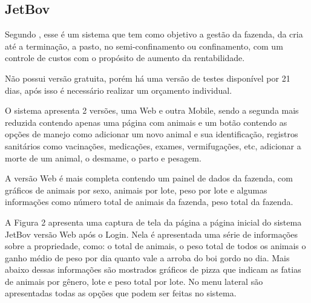 




\subsection{\textbf{JetBov}}

Segundo , esse é um sistema que tem como objetivo a gestão da fazenda, da cria até a terminação, a pasto, no semi-confinamento ou confinamento, com um controle de custos com o propósito de aumento da rentabilidade.

Não possui versão gratuita, porém há uma versão de testes disponível por 21 dias, após isso é necessário realizar um orçamento individual.

O sistema apresenta 2 versões, uma Web e outra Mobile, sendo a segunda mais reduzida contendo apenas uma página com animais e um botão contendo as opções de manejo como adicionar um novo animal e sua identificação, registros sanitários como vacinações, medicações, exames, vermifugações, etc, adicionar a morte de um animal, o desmame, o parto e pesagem.

A versão Web é mais completa contendo um painel de dados da fazenda, com gráficos de animais por sexo, animais por lote, peso por lote e algumas informações como número total de animais da fazenda, peso total da fazenda.

A Figura 2 apresenta uma captura de tela da página a página inicial do sistema JetBov versão Web após o Login. Nela é apresentada uma série de informações sobre a propriedade, como: o total de animais, o peso total de todos os animais o ganho médio de peso por dia quanto vale a arroba do boi gordo no dia. Mais abaixo dessas informações são mostrados gráficos de pizza que indicam as fatias de animais por gênero, lote e peso total por lote. No menu lateral são apresentadas todas as opções que podem ser feitas no sistema.

